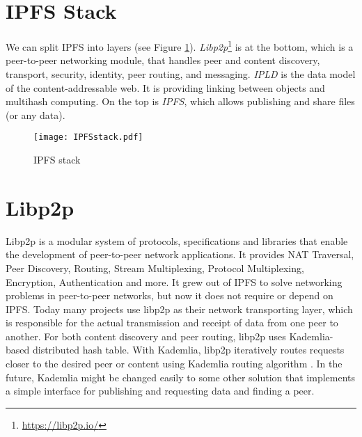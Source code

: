 \section{IPFS Stack}
We can split IPFS into layers (see Figure \ref{IPFSstack}). \textit{Libp2p}\footnote{\url{https://libp2p.io/}} is at the bottom, which is a peer-to-peer networking module, that handles peer and content discovery, transport, security, identity, peer routing, and messaging. \textit{IPLD} is the data model of the content-addressable web. It is providing linking between objects and multihash computing. On the top is \textit{IPFS}, which allows publishing and share files (or any data). \cite{IPFSwhitepaper}


\begin{figure}[h]
    \centering
    \texttt{[image: IPFSstack.pdf]}
    \caption{IPFS stack}
    \label{IPFSstack}
\end{figure}


\section{Libp2p}
Libp2p is a modular system of protocols, specifications and libraries that enable the development of peer-to-peer network applications. It provides NAT Traversal, Peer Discovery, Routing, Stream Multiplexing, Protocol Multiplexing, Encryption, Authentication and more. It grew out of IPFS to solve networking problems in peer-to-peer networks, but now it does not require or depend on IPFS. Today many projects use libp2p as their network transporting layer, which is responsible for the actual transmission and receipt of data from one peer to another. For both content discovery and peer routing, libp2p uses Kademlia-based distributed hash table. With Kademlia, libp2p iteratively routes requests closer to the desired peer or content using Kademlia routing algorithm \cite{kademlia}. In the future, Kademlia might be changed easily to some other solution that implements a simple interface for publishing and requesting data and finding a peer. \cite{WebEngineering}





